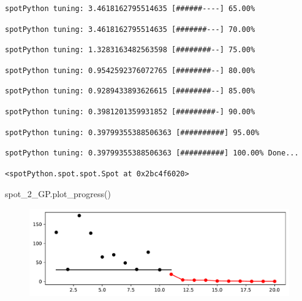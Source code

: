 \documentclass[
  letterpaper,
  DIV=11,
  numbers=noendperiod]{scrreprt}
\newenvironment{Shaded}{\begin{snugshade}}{\end{snugshade}}
\newcommand{\NormalTok}[1]{\textcolor[rgb]{0.00,0.23,0.31}{#1}}
\begin{document}
\begin{verbatim}
spotPython tuning: 3.4618162795514635 [######----] 65.00% 
\end{verbatim}

\begin{verbatim}
spotPython tuning: 3.4618162795514635 [#######---] 70.00% 
\end{verbatim}

\begin{verbatim}
spotPython tuning: 1.3283163482563598 [########--] 75.00% 
\end{verbatim}

\begin{verbatim}
spotPython tuning: 0.9542592376072765 [########--] 80.00% 
\end{verbatim}

\begin{verbatim}
spotPython tuning: 0.9289433893626615 [########--] 85.00% 
\end{verbatim}

\begin{verbatim}
spotPython tuning: 0.3981201359931852 [#########-] 90.00% 
\end{verbatim}

\begin{verbatim}
spotPython tuning: 0.39799355388506363 [##########] 95.00% 
\end{verbatim}

\begin{verbatim}
spotPython tuning: 0.39799355388506363 [##########] 100.00% Done...
\end{verbatim}

\begin{verbatim}
<spotPython.spot.spot.Spot at 0x2bc4f6020>
\end{verbatim}

\begin{Shaded}
\begin{Highlighting}[]
\NormalTok{spot\_2\_GP.plot\_progress()}
\end{Highlighting}
\end{Shaded}

\begin{figure}[H]

{\centering \includegraphics{04_spot_sklearn_surrogate_files/figure-pdf/cell-18-output-1.pdf}

}

\end{figure}
\end{document}
